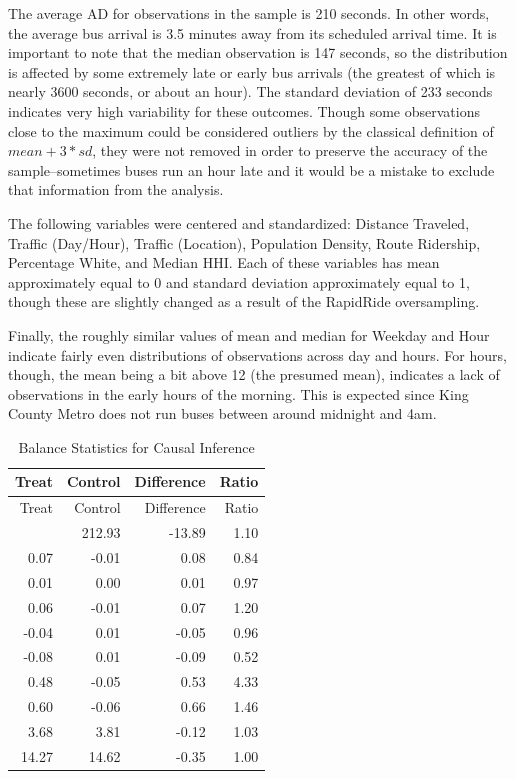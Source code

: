\documentclass[
  12pt,
]{article}
\begin{document}
The average AD for observations in the sample is 210 seconds. In other
words, the average bus arrival is 3.5 minutes away from its scheduled
arrival time. It is important to note that the median observation is 147
seconds, so the distribution is affected by some extremely late or early
bus arrivals (the greatest of which is nearly 3600 seconds, or about an
hour). The standard deviation of 233 seconds indicates very high
variability for these outcomes. Though some observations close to the
maximum could be considered outliers by the classical definition of
\(mean + 3*sd\), they were not removed in order to preserve the accuracy
of the sample--sometimes buses run an hour late and it would be a
mistake to exclude that information from the analysis.

The following variables were centered and standardized: Distance
Traveled, Traffic (Day/Hour), Traffic (Location), Population Density,
Route Ridership, Percentage White, and Median HHI. Each of these
variables has mean approximately equal to 0 and standard deviation
approximately equal to 1, though these are slightly changed as a result
of the RapidRide oversampling.

Finally, the roughly similar values of mean and median for Weekday and
Hour indicate fairly even distributions of observations across day and
hours. For hours, though, the mean being a bit above 12 (the presumed
mean), indicates a lack of observations in the early hours of the
morning. This is expected since King County Metro does not run buses
between around midnight and 4am.

\begin{longtable}[]{@{}rrrr@{}}
\caption{Balance Statistics for Causal Inference}\tabularnewline
\toprule\noalign{}
Treat & Control & Difference & Ratio \\
\midrule\noalign{}
\endfirsthead
\toprule\noalign{}
Treat & Control & Difference & Ratio \\
\midrule\noalign{}
\endhead
\bottomrule\noalign{}
\endlastfoot
199.04 & 212.93 & -13.89 & 1.10 \\
0.07 & -0.01 & 0.08 & 0.84 \\
0.01 & 0.00 & 0.01 & 0.97 \\
0.06 & -0.01 & 0.07 & 1.20 \\
-0.04 & 0.01 & -0.05 & 0.96 \\
-0.08 & 0.01 & -0.09 & 0.52 \\
0.48 & -0.05 & 0.53 & 4.33 \\
0.60 & -0.06 & 0.66 & 1.46 \\
3.68 & 3.81 & -0.12 & 1.03 \\
14.27 & 14.62 & -0.35 & 1.00 \\
\end{longtable}
\end{document}
